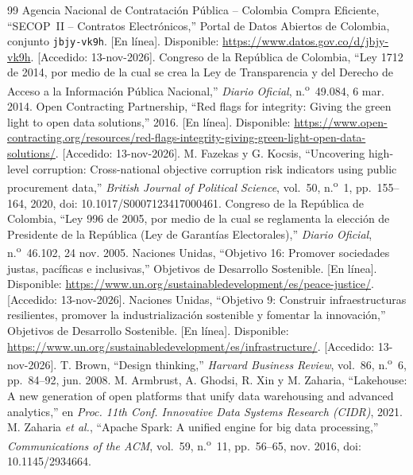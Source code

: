 \begin{thebibliography}{99}
\small
{} Agencia Nacional de Contratación Pública -- Colombia Compra Eficiente, ``SECOP~II -- Contratos Electrónicos,'' Portal de Datos Abiertos de Colombia, conjunto \texttt{jbjy-vk9h}. [En línea]. Disponible: \url{https://www.datos.gov.co/d/jbjy-vk9h}. [Accedido: 13-nov-2026].
 Congreso de la República de Colombia, ``Ley 1712 de 2014, por medio de la cual se crea la Ley de Transparencia y del Derecho de Acceso a la Información Pública Nacional,'' \emph{Diario Oficial}, n.\textsuperscript{o}~49.084, 6 mar. 2014.
 Open Contracting Partnership, ``Red flags for integrity: Giving the green light to open data solutions,'' 2016. [En línea]. Disponible: \url{https://www.open-contracting.org/resources/red-flags-integrity-giving-green-light-open-data-solutions/}. [Accedido: 13-nov-2026].
 M. Fazekas y G. Kocsis, ``Uncovering high-level corruption: Cross-national objective corruption risk indicators using public procurement data,'' \emph{British Journal of Political Science}, vol.~50, n.\textsuperscript{o}~1, pp.~155--164, 2020, doi: 10.1017/S0007123417000461.
 Congreso de la República de Colombia, ``Ley 996 de 2005, por medio de la cual se reglamenta la elección de Presidente de la República (Ley de Garantías Electorales),'' \emph{Diario Oficial}, n.\textsuperscript{o}~46.102, 24 nov. 2005.
 Naciones Unidas, ``Objetivo 16: Promover sociedades justas, pacíficas e inclusivas,'' Objetivos de Desarrollo Sostenible. [En línea]. Disponible: \url{https://www.un.org/sustainabledevelopment/es/peace-justice/}. [Accedido: 13-nov-2026].
 Naciones Unidas, ``Objetivo 9: Construir infraestructuras resilientes, promover la industrialización sostenible y fomentar la innovación,'' Objetivos de Desarrollo Sostenible. [En línea]. Disponible: \url{https://www.un.org/sustainabledevelopment/es/infrastructure/}. [Accedido: 13-nov-2026].
 T. Brown, ``Design thinking,'' \emph{Harvard Business Review}, vol.~86, n.\textsuperscript{o}~6, pp.~84--92, jun. 2008.
 M. Armbrust, A. Ghodsi, R. Xin y M. Zaharia, ``Lakehouse: A new generation of open platforms that unify data warehousing and advanced analytics,'' en \emph{Proc. 11th Conf. Innovative Data Systems Research (CIDR)}, 2021.
 M. Zaharia \emph{et al.}, ``Apache Spark: A unified engine for big data processing,'' \emph{Communications of the ACM}, vol.~59, n.\textsuperscript{o}~11, pp.~56--65, nov. 2016, doi: 10.1145/2934664.

\end{thebibliography}
